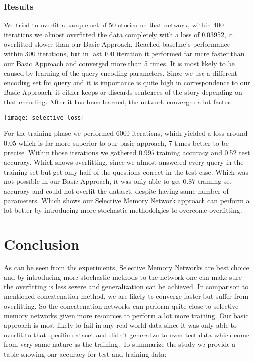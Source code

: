 \documentclass[conference,compsoc]{IEEEtran}
\begin{document}
\subsubsection{Results}
We tried to overfit a sample set of 50 stories on that network, within 400 iterations
we almost overfitted the data completely with a loss of 0.03952, it overfitted slower than
our Basic Approach. Reached baseline's performance within 300 iterations, but in last 100
iteration it performed far more faster than our Basic Approach and converged more than 5
times. It is most likely to be caused by learning of the query encoding parameters. Since
we use a different encoding set for query and it is importance is quite high in correspondence
to our Basic Approach, it either keeps or discards sentences of the story depending on that
encoding. After it has been learned, the network converges a lot faster.

\texttt{[image: selective\_loss]}

For the training phase we performed 6000 iterations, which yielded a loss around 0.05
which is far more superior to our basic approach, 7 times better to be precise. 
Within those iterations we gathered 0.995 training accuracy and 0.52 test accuracy.
Which shows overfitting, since we almost answered every query in the training set
but get only half of the questions correct in the test case. Which was not possible
in our Basic Approach, it was only able to get 0.87 training set accuracy and could
not overfit the dataset, despite having same number of parameters. Which shows
our Selective Memory Network approach can perform a lot better by introducing more
stochastic methodolgies to overcome overfitting.

\pagebreak
\section{Conclusion}
As can be seen from the experiments, Selective Memory Networks are best choice and
by introducing more stochastic methods to the network one can make sure the overfitting
is less severe and generalization can be achieved. In comparison to mentioned concatenation
method, we are likely to converge faster but suffer from overfitting. So the concatenation
networks can perform quite close to selective memory networks given more resources to
perform a lot more training. Our basic approach is most likely to fail in any real world
data since it was only able to overfit to that spesific dataset and didn't generalize
to even test data which come from very same nature as the training. To summarize the
study we provide a table showing our accuracy for test and training data:
\end{document}
